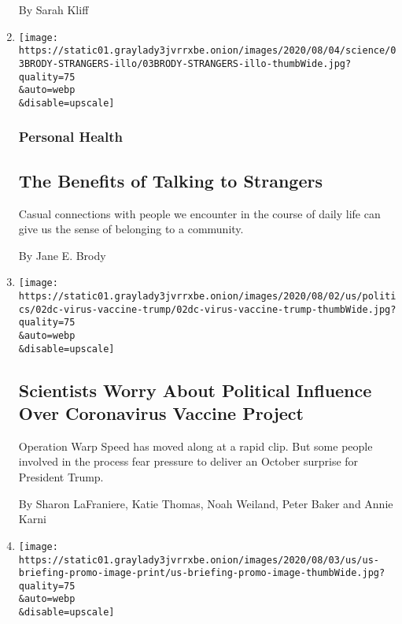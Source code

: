 \begin{enumerate}
  By Sarah Kliff
\item
  \href{/2020/08/03/well/family/the-benefits-of-talking-to-strangers.html}{}

  \texttt{[image: https://static01.graylady3jvrrxbe.onion/images/2020/08/04/science/03BRODY-STRANGERS-illo/03BRODY-STRANGERS-illo-thumbWide.jpg?quality=75\\\&auto=webp\\\&disable=upscale]}

  \hypertarget{personal-health}{%
  \subsubsection{Personal Health}\label{personal-health}}

  \hypertarget{the-benefits-of-talking-to-strangers-1}{%
  \subsection{The Benefits of Talking to
  Strangers}\label{the-benefits-of-talking-to-strangers-1}}

  Casual connections with people we encounter in the course of daily
  life can give us the sense of belonging to a community.

  By Jane E. Brody
\item
  \href{/2020/08/02/us/politics/coronavirus-vaccine.html}{}

  \texttt{[image: https://static01.graylady3jvrrxbe.onion/images/2020/08/02/us/politics/02dc-virus-vaccine-trump/02dc-virus-vaccine-trump-thumbWide.jpg?quality=75\\\&auto=webp\\\&disable=upscale]}

  \hypertarget{scientists-worry-about-political-influence-over-coronavirus-vaccine-project}{%
  \subsection{Scientists Worry About Political Influence Over
  Coronavirus Vaccine
  Project}\label{scientists-worry-about-political-influence-over-coronavirus-vaccine-project}}

  Operation Warp Speed has moved along at a rapid clip. But some people
  involved in the process fear pressure to deliver an October surprise
  for President Trump.

  By Sharon LaFraniere, Katie Thomas, Noah Weiland, Peter Baker and
  Annie Karni
\item
  \href{/2020/08/02/world/coronavirus-covid-19.html}{}

  \texttt{[image: https://static01.graylady3jvrrxbe.onion/images/2020/08/03/us/us-briefing-promo-image-print/us-briefing-promo-image-thumbWide.jpg?quality=75\\\&auto=webp\\\&disable=upscale]}


\end{enumerate}
